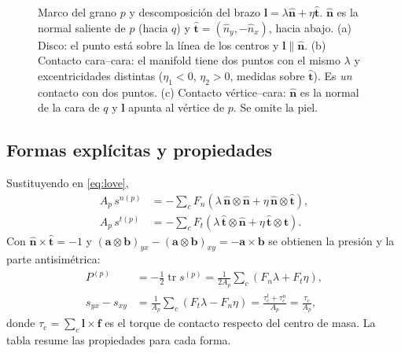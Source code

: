 \documentclass[11pt,a4paper]{article}
\newcommand{\vect}[1]{\mathbf{#1}}
\newcommand{\nh}{\hat{\vect{n}}}
\newcommand{\tvh}{\hat{\vect{t}}}
\newcommand{\lv}{\vect{l}}
\newcommand{\f}{\vect{f}}
\begin{document}
\begin{figure}[htbp]
\caption{Marco del grano $p$ y descomposición del brazo
  $\lv = \lambda\nh + \eta\tvh$. $\nh$ es la normal saliente de $p$
  (hacia $q$) y $\tvh = (\hat n_y, -\hat n_x)$, hacia abajo. (a) Disco:
  el punto está sobre la línea de los centros y $\lv\parallel\nh$.
  (b) Contacto cara--cara: el manifold tiene dos puntos con el mismo
  $\lambda$ y excentricidades distintas ($\eta_1 < 0$, $\eta_2 > 0$,
  medidas sobre $\tvh$). Es \emph{un} contacto con dos puntos. (c)
  Contacto vértice--cara: $\nh$ es la normal de la cara de $q$ y $\lv$
  apunta al vértice de $p$. Se omite la piel.}
\label{fig:contactos}
\end{figure}

\subsection{Formas explícitas y propiedades}
\label{sec:prop}

Sustituyendo en \eqref{eq:love},
\begin{align}
  A_p\, s^{n(p)} &= -\sum_c F_n\left(\lambda\,\nh\otimes\nh
                     + \eta\,\nh\otimes\tvh\right), \label{eq:sn}\\
  A_p\, s^{t(p)} &= -\sum_c F_t\left(\lambda\,\tvh\otimes\nh
                     + \eta\,\tvh\otimes\tvh\right). \label{eq:st}
\end{align}
Con $\nh\times\tvh = -1$ y
$(\vect{a}\otimes\vect{b})_{yx} - (\vect{a}\otimes\vect{b})_{xy} =
-\vect{a}\times\vect{b}$ se obtienen la presión y la parte antisimétrica:
\begin{align}
  P^{(p)} &= -\tfrac12\operatorname{tr}s^{(p)}
    = \frac{1}{2A_p}\sum_c\left(F_n\lambda + F_t\eta\right),
    \label{eq:presion}\\
  s_{yx} - s_{xy} &= \frac{1}{A_p}\sum_c\left(F_t\lambda - F_n\eta\right)
    = \frac{\tau^t_\text{c} + \tau^n_\text{c}}{A_p}
    = \frac{\tau_\text{c}}{A_p},
    \label{eq:torque}
\end{align}
donde $\tau_\text{c} = \sum_c \lv\times\f$ es el torque de contacto
respecto del centro de masa. La tabla resume las propiedades para cada
forma.
\end{document}
